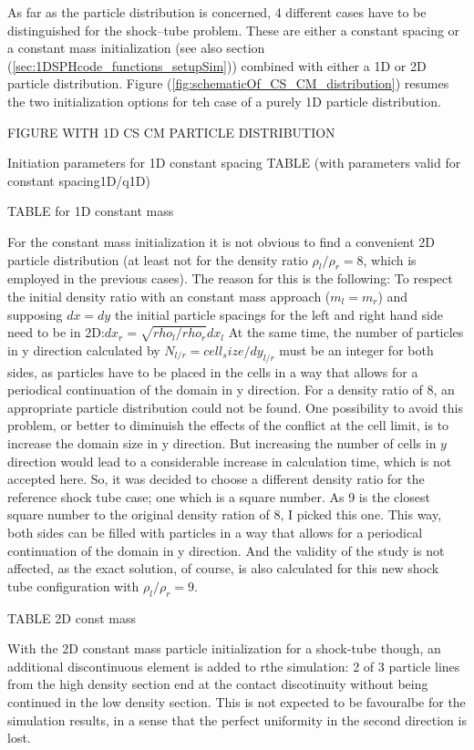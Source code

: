 \documentclass{report}
\begin{document}
As far as the particle distribution is concerned, 4 different cases have to be distinguished for the shock--tube problem. These are either a constant spacing or a constant mass initialization (see also section (\ref{sec:1DSPHcode_functions_setupSim})) combined with either a 1D or 2D particle distribution.
Figure (\ref{fig:schematicOf_CS_CM_distribution}) resumes the two initialization options for teh case of a purely 1D particle distribution.

FIGURE WITH 1D CS CM PARTICLE DISTRIBUTION

Initiation parameters for 1D constant spacing TABLE
(with parameters valid for constant spacing1D/q1D)


TABLE for 1D constant mass


For the constant mass initialization it is not obvious to find a convenient 2D particle distribution (at least not for the density ratio $\rho_l/\rho_r=8$, which is employed in the previous cases). The reason for this is the following:
To respect the initial density ratio with an constant mass approach ($m_l=m_r$) and supposing $dx=dy$ the initial particle spacings for the left and right hand side need to be in 2D:$dx_r=\sqrt{rho_l/rho_r} dx_l$
At the same time, the number of particles in y direction calculated by $N_{l/r}=cell_size/dy_{l/r}$ must 
be an integer for both sides, as particles have to be placed in the cells in a way that allows for a periodical continuation of the domain in y direction.
For a density ratio of 8, an appropriate particle distribution could not be found. One possibility to avoid this problem, or better to diminuish the effects of the conflict at the cell limit, is to increase the domain size in y direction. But increasing the number of cells in $y$ direction would lead to a considerable increase in calculation time, which is not accepted here. So, it was decided to choose a different density ratio for the reference shock tube case; one which is a square number. As 9 is the closest square number to the original density ration of 8, I picked this one.
This way, both sides can be filled with particles in a way that allows for a periodical continuation of the domain in y direction. And the validity of the study is not affected, as the exact solution, of course, is also calculated for this new shock tube configuration with $\rho_l/\rho_r=9$. 

TABLE 2D const mass

With the 2D constant mass particle initialization for a shock-tube though, an additional discontinuous element is added to rthe simulation: 2 of 3 particle lines from the high density section end at the contact discotinuity without being continued in the low density section. This is not expected to be favouralbe for the simulation results, in a sense that the perfect uniformity in the second direction is lost.
\end{document}
